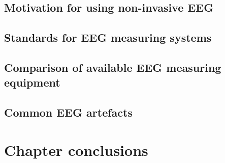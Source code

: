 \subsection{Motivation for using non-invasive EEG}
\label{subsec:biomedical_signals_measuring_why_eeg}


\lipsum[1-2]


\subsection{Standards for EEG measuring systems}
\label{subsec:biomedical_signals_measuring_standards}

\lipsum[1-2]


\subsection{Comparison of available EEG measuring equipment}
\label{subsec:biomedical_signals_measuring_equipment}

\lipsum[1-7]




\subsection{Common EEG artefacts}
\label{subsec:biomedical_signals_measuring_artefacts}

\lipsum[1-5]

\section{Chapter conclusions}
\label{sec:biomedical_signals_summary}

\lipsum[1-3]